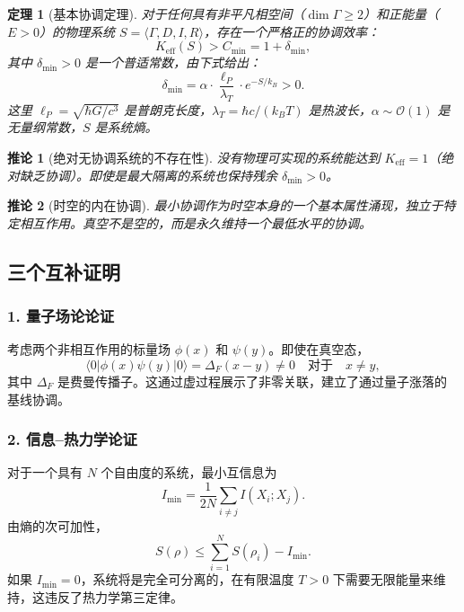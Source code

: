 \documentclass[11pt,a4paper]{article}
\newtheorem{theorem}{定理}
\newtheorem{corollary}{推论}
\begin{document}
	\begin{theorem}[基本协调定理]
		对于任何具有非平凡相空间（\(\dim\Gamma \geq 2\)）和正能量（\(E > 0\)）的物理系统 \(S = \langle \Gamma, D, I, R \rangle\)，存在一个严格正的协调效率：
		\begin{equation}
			\boxed{K_{\mathrm{eff}}(S) > C_{\min} = 1 + \delta_{\min}},
		\end{equation}
		其中 \(\delta_{\min} > 0\) 是一个普适常数，由下式给出：
		\begin{equation}
			\delta_{\min} = \alpha \cdot \frac{\ell_P}{\lambda_T} \cdot e^{-S/k_B} > 0.
			\label{eq:delta-min}
		\end{equation}
		这里 \(\ell_P = \sqrt{\hbar G / c^3}\) 是普朗克长度，\(\lambda_T = \hbar c / (k_B T)\) 是热波长，\(\alpha \sim \mathcal{O}(1)\) 是无量纲常数，\(S\) 是系统熵。
	\end{theorem}
	
	\begin{corollary}[绝对无协调系统的不存在性]
		没有物理可实现的系统能达到 \(K_{\mathrm{eff}} = 1\)（绝对缺乏协调）。即使是最大隔离的系统也保持残余 \(\delta_{\min} > 0\)。
	\end{corollary}
	
	\begin{corollary}[时空的内在协调]
		最小协调作为时空本身的一个基本属性涌现，独立于特定相互作用。真空不是空的，而是永久维持一个最低水平的协调。
	\end{corollary}
	
	\subsection{三个互补证明}
	
	\subsubsection*{1. 量子场论论证}
	考虑两个非相互作用的标量场 \(\phi(x)\) 和 \(\psi(y)\)。即使在真空态，
	\[
	\langle 0 | \phi(x) \psi(y) | 0 \rangle = \Delta_F(x-y) \neq 0 \quad
	\text{对于} \quad x \neq y,
	\]
	其中 \(\Delta_F\) 是费曼传播子。这通过虚过程展示了非零关联，建立了通过量子涨落的基线协调。
	
	\subsubsection*{2. 信息–热力学论证}
	对于一个具有 \(N\) 个自由度的系统，最小互信息为
	\[
	I_{\min} = \frac{1}{2N} \sum_{i \neq j} I(X_i; X_j).
	\]
	由熵的次可加性，
	\[
	S(\rho) \leq \sum_{i=1}^N S(\rho_i) - I_{\min}.
	\]
	如果 \(I_{\min}=0\)，系统将是完全可分离的，在有限温度 \(T>0\) 下需要无限能量来维持，这违反了热力学第三定律。
	
\end{document}
